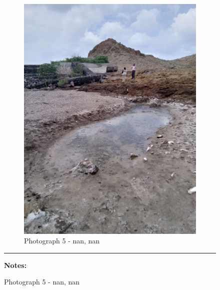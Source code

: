 \documentclass[12pt, letterpaper]{article}
\begin{document}
\begin{figure}[h]
{{                \begin{subfigure}{\linewidth}
                    \centering
                    \includegraphics[width=0.37\textheight, angle=-90]{photos/2.png}
                    \captionsetup{width=0.8\linewidth}
                    \caption{Photograph 5 - nan, nan}
                \end{subfigure}

                    \vspace{\baselineskip}

                    \hrule
                    \begin{minipage}[c][3.5cm][t]{0.4\textwidth} %
                            \begin{minipage}[t][1.5cm][t]{0.4\textwidth} %
                            \vspace{2mm}
                            \hspace{2mm}
                                \raggedright
                                \textbf{\small{Notes:} \footnotesize{}}


\end{minipage}
\end{minipage}}}
\end{figure}
\end{document}
